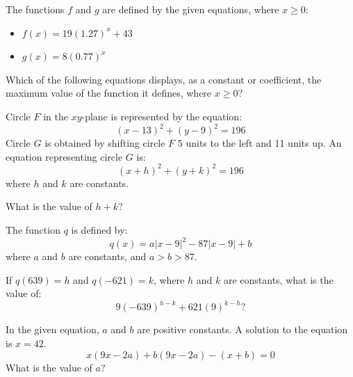 \vspace{2em}
\newpage

\noindent\markforreview
\vspace{1em}

The functions \(f\) and \(g\) are defined by the given equations, where \(x \geq 0\):

\begin{itemize}
\item[I] \(f(x) = 19(1.27)^x + 43\)
\item[II] \(g(x) = 8(0.77)^x\)
\end{itemize}

Which of the following equations displays, as a constant or coefficient, the maximum value of the function it defines, where \(x \geq 0\)?

\vspace{0.75em}


\vspace{2em}
\newpage

\noindent\markforreview
\vspace{1em}

Circle \(F\) in the \(xy\)-plane is represented by the equation:
\[
(x - 13)^2 + (y - 9)^2 = 196
\]
Circle \(G\) is obtained by shifting circle \(F\) 5 units to the left and 11 units up. An equation representing circle \(G\) is:
\[
(x + h)^2 + (y + k)^2 = 196
\]
where \(h\) and \(k\) are constants.

What is the value of \(h + k\)?

\vspace{2em}
\newpage

\noindent\markforreview
\vspace{1em}

The function \(q\) is defined by:
\[
q(x) = a|x - 9|^2 - 87|x - 9| + b
\]
where \(a\) and \(b\) are constants, and \(a > b > 87\).

If \(q(639) = h\) and \(q(-621) = k\), where \(h\) and \(k\) are constants, what is the value of:
\[
9(-639)^{h-k} + 621(9)^{k-h}?
\]

\vspace{2em}
\newpage

\noindent\markforreview
\vspace{1em}

In the given equation, \(a\) and \(b\) are positive constants. A solution to the equation is \(x = 42\).
\[
x(9x - 2a) + b(9x - 2a) - (x + b) = 0
\]
What is the value of \(a\)?

